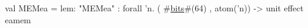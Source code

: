 val MEMea = {lem: "MEMea"} : forall 'n.
  ( #\hyperref[zbits]{bits}#(64) , atom('n)) -> unit effect { eamem }
